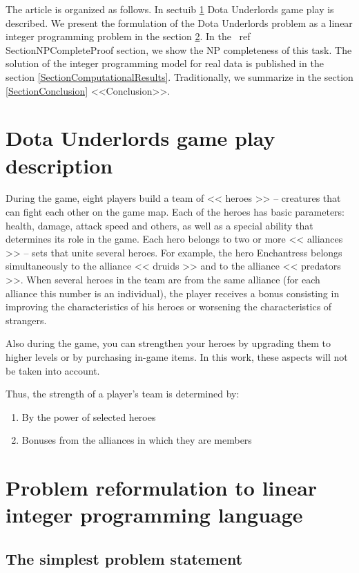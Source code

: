 \documentclass{article}
\begin{document}
The article is organized as follows. In sectuib \ref{SectionDUDescription} Dota Underlords game play is described.
We present the formulation of the Dota Underlords problem as a linear integer programming problem in the section \ref{SectionDUIP}. In the \ ref {SectionNPCompleteProof} section, we show the NP completeness of this task. The solution of the integer programming model for real data is published in the section \ref{SectionComputationalResults}. Traditionally, we summarize in the section \ref{SectionConclusion} <<Conclusion>>.

\section{Dota Underlords game play description}
\label{SectionDUDescription}

During the game, eight players build a team of << heroes >> -- creatures that can fight each other on the game map. Each of the heroes has basic parameters: health, damage, attack speed and others, as well as a special ability that determines its role in the game. Each hero belongs to two or more << alliances >> -- sets that unite several heroes. For example, the hero Enchantress belongs simultaneously to the alliance << druids >> and to the alliance << predators >>. When  several heroes in the team are from the same alliance (for each alliance this number is an individual), the player receives a bonus consisting in improving the characteristics of his heroes or worsening the characteristics of strangers.

Also during the game, you can strengthen your heroes by upgrading them to higher levels or by purchasing in-game items. In this work, these aspects will not be taken into account.

Thus, the strength of a player’s team is determined by:

\begin{enumerate}
    \item By the power of selected heroes
    \item Bonuses from the alliances in which they are members
\end{enumerate}


\section{Problem reformulation to linear integer programming language }
\label{SectionDUIP}

\subsection{The simplest problem statement}
\end{document}
